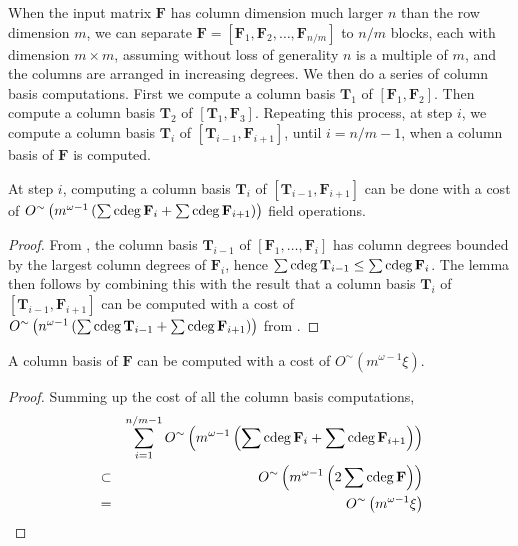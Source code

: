 When the input matrix $\mathbf{F}$ has column dimension much larger
$n$ than the row dimension $m$, we can separate $\mathbf{F}=\left[\mathbf{F}_{1},\mathbf{F}_{2},\dots,\mathbf{F}_{n/m}\right]$
to $n/m$ blocks, each with dimension $m\times m$, assuming without
loss of generality $n$ is a multiple of $m$, and the columns are
arranged in increasing degrees. We then do a series of column basis
computations. First we compute a column basis $\mathbf{T}_{1}$ of
$\left[\mathbf{F}_{1},\mathbf{F}_{2}\right]$. Then compute a column
basis $\mathbf{T}_{2}$ of $\left[\mathbf{T}_{1},\mathbf{F}_{3}\right]$.
Repeating this process, at step $i$, we compute a column basis $\mathbf{T}_{i}$
of $\left[\mathbf{T}_{i-1},\mathbf{F}_{i+1}\right]$, until $i=n/m-1$,
when a column basis of $\mathbf{F}$ is computed.
\begin{lem}
At step $i$, computing a column basis $\mathbf{T}_{i}$ of $\left[\mathbf{T}_{i-1},\mathbf{F}_{i+1}\right]$
can be done with a cost of $O^{\sim}\left(m^{\omega-1}\left(\sum\cdeg\mathbf{F}_{i}+\sum\cdeg\mathbf{F}_{i+1}\right)\right)$
field operations.\end{lem}
\begin{proof}
From , the column
basis $\mathbf{T}_{i-1}$ of $\left[\mathbf{F}_{1},\dots,\mathbf{F}_{i}\right]$
has column degrees bounded by the largest column degrees of $\mathbf{F}_{i}$,
hence $\sum\cdeg\mathbf{T}_{i-1}\le\sum\cdeg\mathbf{F}_{i}$. The
lemma then follows by combining this with the result that a column
basis $\mathbf{T}_{i}$ of $\left[\mathbf{T}_{i-1},\mathbf{F}_{i+1}\right]$
can be computed with a cost of $O^{\sim}\left(n^{\omega-1}\left(\sum\cdeg\mathbf{T}_{i-1}+\sum\cdeg\mathbf{F}_{i+1}\right)\right)$
from .\end{proof}
\begin{thm}
\label{thm:finalCollBasisCost}A column basis of $\mathbf{F}$ can
be computed with a cost of $O^{\sim}\left(m^{\omega-1}\xi\right)$.\end{thm}
\begin{proof}
Summing up the cost of all the column basis computations, 
\begin{eqnarray*}
 &  & \sum_{i=1}^{n/m-1}O^{\sim}\left(m^{\omega-1}\left(\sum\cdeg\mathbf{F}_{i}+\sum\cdeg\mathbf{F}_{i+1}\right)\right)\\
 & \subset & O^{\sim}\left(m^{\omega-1}\left(2\sum\cdeg\mathbf{F}\right)\right)\\
 & = & O^{\sim}\left(m^{\omega-1}\xi\right)
\end{eqnarray*}
\end{proof}
